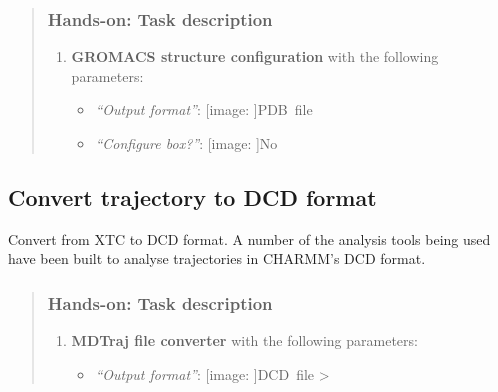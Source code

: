 \documentclass[twocolumn]{bmcart}%
\def\texttt{[image: ]}
\providecommand{\tightlist}{%
  \setlength{\itemsep}{0pt}\setlength{\parskip}{0pt}}
\begin{document}
\begin{quote}
\hypertarget{hands-on-task-description-7}{%
\subsubsection{Hands-on: Task
description}\label{hands-on-task-description-7}}

\begin{enumerate}
\def\labelenumi{\arabic{enumi}.}
\tightlist
\item
  \textbf{GROMACS structure configuration} with the following
  parameters:

  \begin{itemize}
  \tightlist
  \item
    \emph{``Output format''}: \texttt{PDB\ file}
  \item
    \emph{``Configure box?''}: \texttt{No}
  \end{itemize}
\end{enumerate}


\end{quote}

\hypertarget{convert-trajectory-to-dcd-format}{%
\subsection{Convert trajectory to DCD
format}\label{convert-trajectory-to-dcd-format}}

Convert from XTC to DCD format. A number of the analysis tools being
used have been built to analyse trajectories in CHARMM's DCD format.

\begin{quote}
\hypertarget{hands-on-task-description-8}{%
\subsubsection{Hands-on: Task
description}\label{hands-on-task-description-8}}

\begin{enumerate}
\def\labelenumi{\arabic{enumi}.}
\tightlist
\item
  \textbf{MDTraj file converter} with the following parameters:

  \begin{itemize}
  \tightlist
  \item
    \emph{``Output format''}: \texttt{DCD\ file} \textgreater{}
  \end{itemize}
\end{enumerate}


\end{quote}
\end{document}
